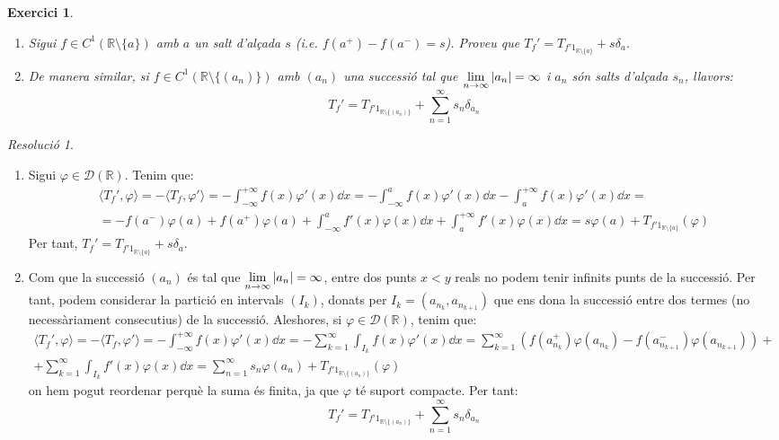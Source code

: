 \documentclass[10pt,a4paper]{article}
\newcommand{\RR}{\ensuremath{\mathbb{R}}} %
\newcommand{\vf}[1]{\boldsymbol{\mathrm{#1}}} %
\newtheorem{exercici}{Exercici}
\theoremstyle{definition}
\theoremstyle{remark}
\newtheorem*{res}{Resolució}
\begin{document}
\begin{exercici}\hfill
  \begin{enumerate}
    \item Sigui $f\in C^1(\RR\setminus\{a\})$ amb $a$ un salt d'alçada $s$ (i.e. $f(a^+) - f(a^-) = s$). Proveu que $T_f'=T_{f'\vf{1}_{\RR\setminus\{a\}}}+s\delta_{a}$.
    \item De manera similar, si $f\in C^1(\RR\setminus\{(a_n)\})$ amb $(a_n)$ una successió tal que $\displaystyle \lim_{n\to\infty}\abs{a_n}=\infty$ i $a_n$ són salts d'alçada $s_n$, llavors:
          $$
            T_f'=T_{f'\vf{1}_{\RR\setminus\{(a_n)\}}}+\sum_{n=1}^\infty s_n\delta_{a_n}
          $$
  \end{enumerate}
\end{exercici}
\begin{res}\hfill
  \begin{enumerate}
    \item Sigui $\varphi\in\mathcal{D}(\RR)$. Tenim que:
          \begin{multline*}
            \langle T_f',\varphi\rangle = -\langle T_f,\varphi'\rangle=-\int_{-\infty}^{+\infty}f(x)\varphi'(x) \dd{x}=-\int_{-\infty}^{a} f(x) \varphi'(x)\dd{x} - \int_{a}^{+\infty} f(x) \varphi'(x)\dd{x} =\\= -f(a^-)\varphi(a)+f(a^+)\varphi(a)+\int_{-\infty}^{a} f'(x) \varphi(x)\dd{x} + \int_{a}^{+\infty} f'(x) \varphi(x)\dd{x} = s \varphi(a) + T_{f'\vf{1}_{\RR\setminus\{a\}}}(\varphi)
          \end{multline*}
          Per tant, $T_f'=T_{f'\vf{1}_{\RR\setminus\{a\}}}+s\delta_{a}$.
    \item Com que la successió $(a_n)$ és tal que $\displaystyle \lim_{n\to\infty}\abs{a_n}=\infty$, entre dos punts $x<y$ reals no podem tenir infinits punts de la successió. Per tant, podem considerar la partició en intervals $(I_k)$, donats per $I_k=(a_{n_k},a_{n_{k+1}})$ que ens dona la successió entre dos termes (no necessàriament consecutius) de la successió. Aleshores, si $\varphi\in\mathcal{D}(\RR)$, tenim que:
          \begin{multline*}
            \langle T_f',\varphi\rangle = -\langle T_f,\varphi'\rangle=-\int_{-\infty}^{+\infty}f(x)\varphi'(x) \dd{x}=-\sum_{k=1}^\infty \int_{I_k} f(x) \varphi'(x)\dd{x} = \sum_{k=1}^\infty \left( f(a_{n_k}^+)\varphi(a_{n_k})-f(a_{n_{k+1}}^-)\varphi(a_{n_{k+1}})\right) +\\+ \sum_{k=1}^\infty \int_{I_k} f'(x) \varphi(x)\dd{x} =\sum_{n=1}^\infty s_n \varphi(a_n) + T_{f'\vf{1}_{\RR\setminus\{(a_n)\}}}(\varphi)
          \end{multline*}
          on hem pogut reordenar perquè la suma és finita, ja que $\varphi$ té suport compacte. Per tant:
          $$
            T_f'=T_{f'\vf{1}_{\RR\setminus\{(a_n)\}}}+\sum_{n=1}^\infty s_n\delta_{a_n}
          $$
  \end{enumerate}
\end{res}
\end{document}
